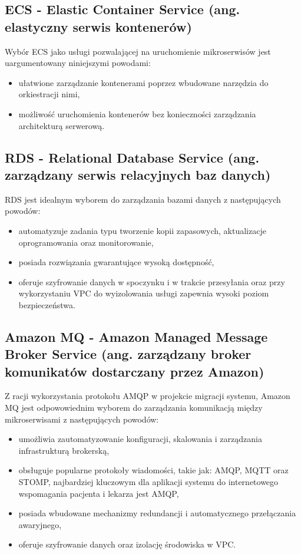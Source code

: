 \documentclass[12pt,twoside]{book}
\begin{document}
\subsection{ECS - Elastic Container Service (ang. elastyczny serwis kontenerów)}
Wybór ECS jako usługi pozwalającej na uruchomienie mikroserwisów jest uargumentowany niniejszymi powodami:

\begin{itemize}
\item ułatwione zarządzanie kontenerami poprzez wbudowane narzędzia do orkiestracji nimi,
\item możliwość uruchomienia kontenerów bez konieczności zarządzania architekturą serwerową. \cite{aws.ecs}
\end{itemize}

\subsection{RDS - Relational Database Service (ang. zarządzany serwis relacyjnych baz danych)}
RDS jest idealnym wyborem do zarządzania bazami danych z następujących powodów:

\begin{itemize}
\item automatyzuje zadania typu tworzenie kopii zapasowych, aktualizacje oprogramowania oraz monitorowanie,
\item posiada rozwiązania gwarantujące wysoką dostępność,
\item oferuje szyfrowanie danych w spoczynku i w trakcie przesyłania oraz przy wykorzystaniu VPC do wyizolowania usługi zapewnia wysoki poziom bezpieczeństwa. \cite{aws.rds}
\end{itemize}

\subsection{Amazon MQ - Amazon Managed Message Broker Service  (ang. zarządzany broker komunikatów dostarczany przez Amazon)}
Z racji wykorzystania protokołu AMQP w projekcie migracji systemu, Amazon MQ jest odpowowiednim wyborem do zarządzania komunikacją między mikroserwisami z następujących powodów:

\begin{itemize}
\item umożliwia zautomatyzowanie konfiguracji, skalowania i zarządzania infrastrukturą brokerską,
\item obsługuje popularne protokoły wiadomości, takie jak: AMQP, MQTT oraz STOMP, najbardziej kluczowym dla aplikacji systemu do internetowego wspomagania pacjenta i lekarza jest AMQP,
\item posiada wbudowane mechanizmy redundancji i automatycznego przełączania awaryjnego,
\item oferuje szyfrowanie danych oraz izolację środowiska w VPC. \cite{aws.mq}
\end{itemize}
\end{document}
